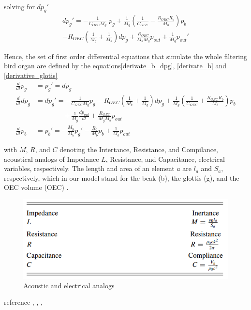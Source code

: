 \begin{itemize}
    solving for $dp_g'$
    \begin{multline}\label{derivative_glotis}
         dp_g'= -\frac{1}{C_{OEC}M_g}\; p_g+\frac{1}{M_g}\left(\frac{1}{C_{OEC}} -\frac{R_{OEC}R_b}{M_b}\right)p_b \\
         -R_{OEC}\left(\frac{1}{M_g}+
         \frac{1}{M_b}\right) dp_g +  \frac{R_{OEC}}{M_bM_g} p_{out} + \frac{1}{M_g}p_{out}'
    \end{multline}
    
    Hence, the set of first order differential equations that simulate the whole filtering bird organ are defined by the equations\eqref{derivate_b_dpg}, \eqref{derivate_b} and \eqref{derivative_glotis}
    \begin{align}\label{OEC_edos}
        \frac{d}{dt} p_g &= p_g'= dp_g \nonumber\\
        \frac{d}{dt} dp_g  &= dp_g'= -\frac{1}{C_{OEC} M_g}p_g  - R_{OEC} \left( \frac{1}{M_b} + \frac{1}{M_g}\right) dp_g + \frac{1}{M_g}\left( \frac{1}{C_{OEC} } + \frac{R_{OEC} R_b}{ M_b}\right) p_b \nonumber\\
        &  \qquad \qquad + \frac{1}{M_g}\frac{dp_{out} }{dt} + \frac{R_{OEC}}{M_g M_b  }  p_{out} \nonumber\\
        \frac{d}{dt} p_b &= p_b' = -  \frac{M_g}{M_b}  p_g' - \frac{R_b}{M_b} p_b + \frac{1}{M_b} p_{out}
    \end{align}
    
    with $M$, $R$, and $C$ denoting the Intertance, Resistance, and Compilance, acoustical analogs of Impedance $L$, Resistance, and Capacitance, electrical variables, respectively. The length and area of an element $a$ are $l_a$ and $S_a$, respectively, which in our model stand for the beak (b), the glottis (g), and the OEC volume (OEC) \cite{OEC_currents, OEC_circuit}.
    
\begin{figure}[H]
    \centering
    \includegraphics[scale=0.55]{Images/acoustic_analog.png}
    \caption{Acoustic and electrical analogs \cite{OEC_circuit} }
    \label{fig:bird_sound_organs}
\end{figure}
    
    
    reference \cite{Neuromuscular}, \cite{birdsongs_ML_new}, \cite{muscles_role}, 

\end{itemize}



